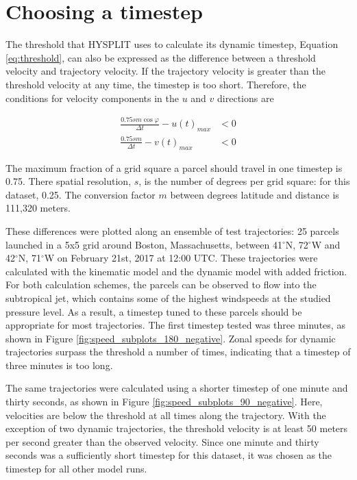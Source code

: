 \section{Choosing a timestep} \label{sec:timestep}
The threshold that HYSPLIT uses to calculate its dynamic timestep, Equation \ref{eq:threshold}, can also be expressed as the difference between a threshold velocity and trajectory velocity.
If the trajectory velocity is greater than the threshold velocity at any time, the timestep is too short.
Therefore, the conditions for velocity components in the $u$ and $v$ directions are

\begin{align}
	\frac{0.75 s m \cos{\varphi}}{\Delta t} - u(t)_{max} &< 0 \\
    \frac{0.75 s m }{\Delta t} - v(t)_{max} &< 0
\end{align}

The maximum fraction of a grid square a parcel should travel in one timestep is 0.75. 
There spatial resolution, $s$, is the number of degrees per grid square: for this dataset, 0.25.
The conversion factor $m$ between degrees latitude and distance is 111,320 meters.

These differences were plotted along an ensemble of test trajectories: 
25 parcels launched in a 5x5 grid around Boston, Massachusetts, between 41$^\circ$N, 72$^\circ$W and 42$^\circ$N, 71$^\circ$W on February 21st, 2017 at 12:00 UTC.
These trajectories were calculated with the kinematic model and the dynamic model with added friction.
For both calculation schemes, the parcels can be observed to flow into the subtropical jet, which contains some of the highest windspeeds at the studied pressure level.
As a result, a timestep tuned to these parcels should be appropriate for most trajectories. 
The first timestep tested was three minutes, as shown in Figure \ref{fig:speed_subplots_180_negative}.
Zonal speeds for dynamic trajectories surpass the threshold a number of times, indicating that a timestep of three minutes is too long.

The same trajectories were calculated using a shorter timestep of one minute and thirty seconds, as shown in Figure \ref{fig:speed_subplots_90_negative}.
Here, velocities are below the threshold at all times along the trajectory. 
With the exception of two dynamic trajectories, the threshold velocity is at least 50 meters per second greater than the observed velocity.
Since one minute and thirty seconds was a sufficiently short timestep for this dataset, it was chosen as the timestep for all other model runs.


